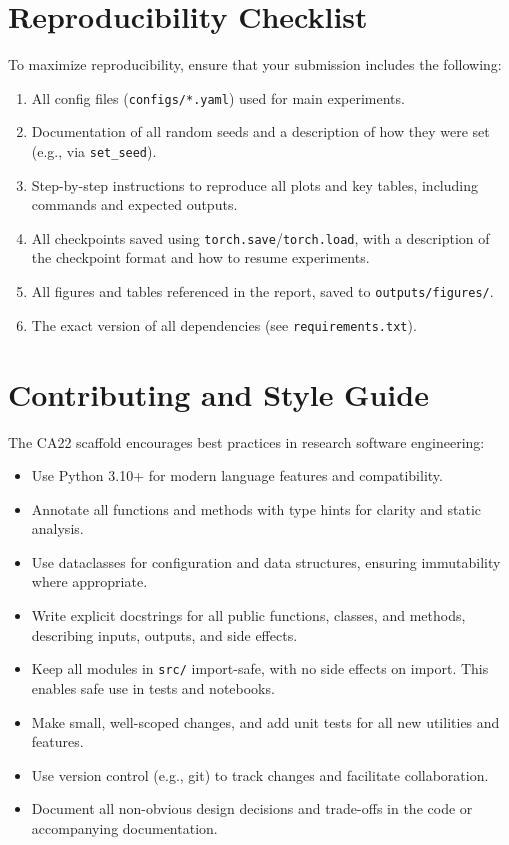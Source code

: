 \documentclass[11pt]{article}
\begin{document}
\section{Reproducibility Checklist}
To maximize reproducibility, ensure that your submission includes the following:
\begin{enumerate}
  \item All config files (\texttt{configs/*.yaml}) used for main experiments.
  \item Documentation of all random seeds and a description of how they were set (e.g., via \texttt{set\_seed}).
  \item Step-by-step instructions to reproduce all plots and key tables, including commands and expected outputs.
  \item All checkpoints saved using \texttt{torch.save}/\texttt{torch.load}, with a description of the checkpoint format and how to resume experiments.
  \item All figures and tables referenced in the report, saved to \texttt{outputs/figures/}.
  \item The exact version of all dependencies (see \texttt{requirements.txt}).
\end{enumerate}


\section{Contributing and Style Guide}
The CA22 scaffold encourages best practices in research software engineering:
\begin{itemize}
  \item Use Python 3.10+ for modern language features and compatibility.
  \item Annotate all functions and methods with type hints for clarity and static analysis.
  \item Use dataclasses for configuration and data structures, ensuring immutability where appropriate.
  \item Write explicit docstrings for all public functions, classes, and methods, describing inputs, outputs, and side effects.
  \item Keep all modules in \texttt{src/} import-safe, with no side effects on import. This enables safe use in tests and notebooks.
  \item Make small, well-scoped changes, and add unit tests for all new utilities and features.
  \item Use version control (e.g., git) to track changes and facilitate collaboration.
  \item Document all non-obvious design decisions and trade-offs in the code or accompanying documentation.
\end{itemize}
\end{document}
